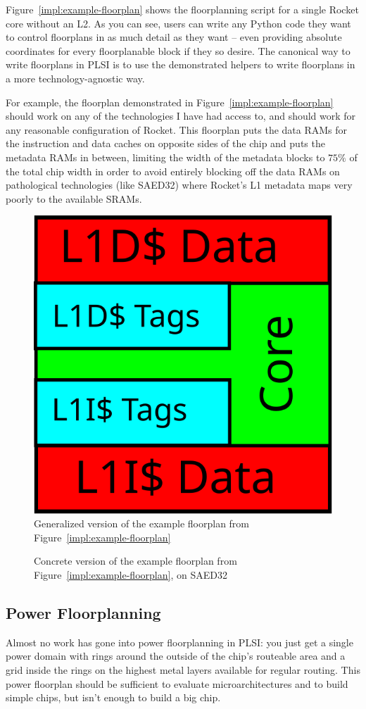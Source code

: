 \documentclass{article}
\begin{document}
Figure~\ref{impl:example-floorplan} shows the floorplanning script for a single
Rocket core without an L2.  As you can see, users can write any Python code
they want to control floorplans in as much detail as they want -- even
providing absolute coordinates for every floorplanable block if they so desire.
The canonical way to write floorplans in PLSI is to use the demonstrated
helpers to write floorplans in a more technology-agnostic way.

For example, the floorplan demonstrated in Figure~\ref{impl:example-floorplan}
should work on any of the technologies I have had access to, and should work
for any reasonable configuration of Rocket.  This floorplan puts the data RAMs
for the instruction and data caches on opposite sides of the chip and puts the
metadata RAMs in between, limiting the width of the metadata blocks to $75\%$
of the total chip width in order to avoid entirely blocking off the data RAMs
on pathological technologies (like SAED32) where Rocket's L1 metadata maps very
poorly to the available SRAMs.

\begin{figure}
  \begin{center}
    \includegraphics[width=0.333\linewidth]{figures/rocket-floorplan-general.svg}
  \end{center}
  \caption{Generalized version of the example floorplan from Figure~\ref{impl:example-floorplan}}
  \label{impl:example-floorplan-output}
\end{figure}

\begin{figure}
  \caption{Concrete version of the example floorplan from Figure~\ref{impl:example-floorplan}, on SAED32}
  \label{impl:example-floorplan-saed32}
\end{figure}

\subsection{Power Floorplanning}

Almost no work has gone into power floorplanning in PLSI: you just get a single
power domain with rings around the outside of the chip's routeable area and a
grid inside the rings on the highest metal layers available for regular
routing.  This power floorplan should be sufficient to evaluate
microarchitectures and to build simple chips, but isn't enough to build
a big chip.
\end{document}
